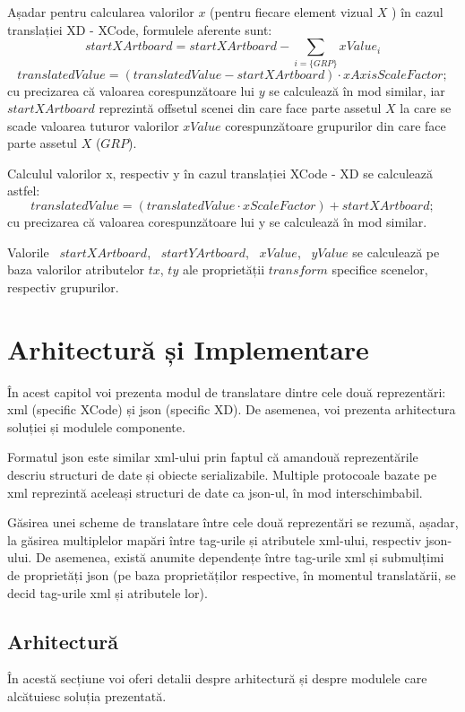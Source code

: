 Așadar pentru calcularea valorilor $x$ (pentru fiecare element vizual $X$ ) în cazul translației XD - XCode, formulele aferente sunt:
        \[ startXArtboard = startXArtboard - \sum_{i = \{GRP\}} xValue_{i} \]
        \[ translatedValue = (translatedValue - {startXArtboard}) \cdot{xAxisScaleFactor};\]
cu precizarea că valoarea corespunzătoare lui $y$ se calculează în mod similar, iar ~$startXArtboard$ reprezintă offsetul scenei din care face parte assetul $X$ la care se scade valoarea tuturor valorilor $xValue$ corespunzătoare grupurilor din care face parte assetul $X$ ($GRP$). 

Calculul valorilor x, respectiv y în cazul translației XCode - XD se calculează astfel:
        \[ translatedValue = ({translatedValue} \cdot{xScaleFactor}) + startXArtboard; \]
cu precizarea că valoarea corespunzătoare lui y se calculează în mod similar.

Valorile ~$startXArtboard$, ~$startYArtboard$, ~$xValue$, ~$yValue$ se calculează pe baza valorilor atributelor $tx$, $ty$ ale proprietății $transform$ specifice scenelor, respectiv grupurilor.

\chapter{Arhitectură și Implementare}

În acest capitol voi prezenta modul de translatare dintre cele două reprezentări: xml (specific XCode) și json (specific XD). De asemenea, voi prezenta arhitectura soluției și modulele componente.

Formatul json este similar xml-ului prin faptul că amandouă reprezentările descriu structuri de date și obiecte serializabile. Multiple protocoale bazate pe xml reprezintă aceleași structuri de date ca json-ul, în mod interschimbabil.

Găsirea unei scheme de translatare între cele două reprezentări se rezumă, așadar, la găsirea multiplelor mapări între tag-urile și atributele xml-ului, respectiv json-ului. De asemenea, există anumite dependențe între tag-urile xml și submulțimi de proprietăți json (pe baza proprietăților respective, în momentul translatării, se decid tag-urile xml și atributele lor).

\section{Arhitectură}

În acestă secțiune voi oferi detalii despre arhitectură și despre modulele care alcătuiesc soluția prezentată.

